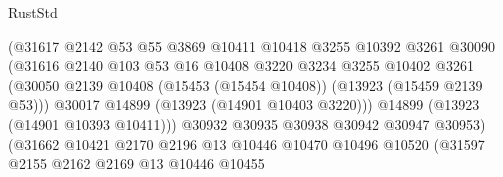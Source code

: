 \begin{lexlean}{RustStd}
\begin{coremodule}
                                      (@31617
                                        @2142
                                        @53
                                        @55
                                        @3869
                                        @10411
                                        @10418
                                        @3255
                                        @10392
                                        @3261
                                        @30090
                                        (@31616
                                          @2140
                                          @103
                                          @53
                                          @16
                                          @10408
                                          @3220
                                          @3234
                                          @3255
                                          @10402
                                          @3261
                                          (@30050
                                            @2139
                                            @10408
                                            (@15453 (@15454 @10408))
                                            (@13923 (@15459 @2139 @53)))
                                          @30017
                                          @14899
                                          (@13923 (@14901 @10403 @3220)))
                                        @14899
                                        (@13923 (@14901 @10393 @10411)))
                                      @30932
                                      @30935
                                      @30938
                                      @30942
                                      @30947
                                      @30953)
                                    (@31662
                                      @10421
                                      @2170
                                      @2196
                                      @13
                                      @10446
                                      @10470
                                      @10496
                                      @10520
                                      (@31597
                                        @2155
                                        @2162
                                        @2169
                                        @13
                                        @10446
                                        @10455

\end{coremodule}
\end{lexlean}
